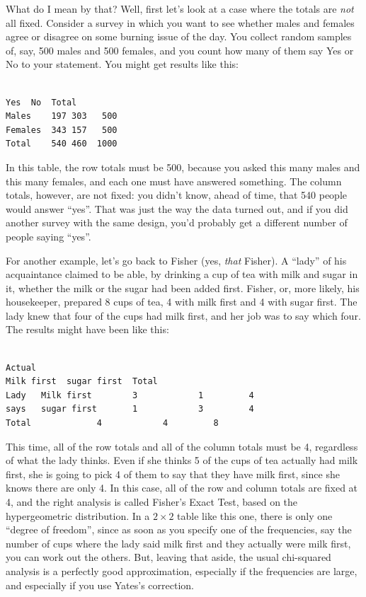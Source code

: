 \documentclass[]{tufte-book}
\theoremstyle{definition}
\theoremstyle{definition}
\theoremstyle{definition}
\theoremstyle{remark}
\begin{document}
What do I mean by that? Well, first let's look at a case where the
totals are \emph{not} all fixed. Consider a survey in which you want to
see whether males and females agree or disagree on some burning issue of
the day. You collect random samples of, say, 500 males and 500 females,
and you count how many of them say Yes or No to your statement.
You might get results like this:

\begin{verbatim}

Yes  No  Total
Males    197 303   500
Females  343 157   500
Total    540 460  1000
\end{verbatim}

In this table, the row totals must be 500, because you asked this many
males and this many females, and each one must have answered something.
The column totals, however, are not fixed: you didn't know, ahead of
time, that 540 people would answer ``yes''. That was just the way the
data turned out, and if you did another survey with the same design,
you'd probably get a different number of people saying ``yes''.

For another example, let's go back to Fisher (yes, \emph{that} Fisher).
A ``lady'' of his acquaintance claimed to be able, by drinking a cup of
tea with milk and sugar in it, whether the milk or the sugar had been
added first. Fisher, or, more likely, his housekeeper, prepared 8 cups
of tea, 4 with milk first and 4 with sugar first. The lady knew that
four of the cups had milk first, and her job was to say which four. The
results might have been like this:

\begin{verbatim}

Actual 
Milk first  sugar first  Total
Lady   Milk first        3            1         4
says   sugar first       1            3         4
Total             4            4         8
\end{verbatim}

This time, all of the row totals and all of the column totals must be 4,
regardless of what the lady thinks. Even if she thinks 5 of the cups of
tea actually had milk first, she is going to pick 4 of them to say that
they have milk first, since she knows there are only 4. In this case,
all of the row and column totals are fixed at 4, and the right analysis
is called Fisher's Exact Test, based on the hypergeometric distribution.
In a \(2\times 2\) table like this one, there is only one ``degree of
freedom'', since as soon as you specify one of the frequencies, say the
number of cups where the lady said milk first and they actually were
milk first, you can work out the others. But, leaving that aside, the
usual chi-squared analysis is a perfectly good approximation, especially
if the frequencies are large, and especially if you use Yates's
correction.
\end{document}
